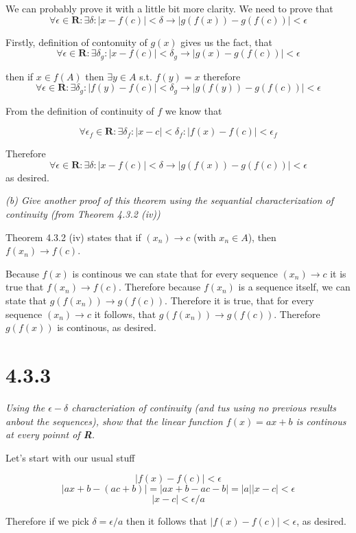 \documentclass[11pt,oneside,titlepage]{book}
\begin{document}
We can probably prove it with a little bit more clarity. We need to prove that
$$\forall \epsilon \in \textbf{R}: \exists \delta: |x - f(c)| < \delta \to
|g(f(x)) - g (f(c))| < \epsilon$$

Firstly, definition of contonuity of $g(x)$ gives us the fact, that 
$$ \forall \epsilon \in \textbf{R}: \exists \delta_g: |x - f(c)| < \delta_g
\to |g(x) - g(f(c))| < \epsilon $$

then if $x \in f(A)$ then $\exists y \in A $ s.t. $f(y) = x$ therefore
$$ \forall \epsilon \in \textbf{R}: \exists \delta_g: |f(y) - f(c)| < \delta_g
\to |g(f(y)) - g(f(c))| < \epsilon $$

From the definition of continuity of $f$ we know that 

$$ \forall \epsilon_f \in \textbf{R}: \exists \delta_f: |x - c | < \delta_f:
|f(x) - f(c)| < \epsilon_f$$

Therefore 
$$\forall \epsilon \in \textbf{R}: \exists \delta: |x - f(c)| < \delta \to
|g(f(x)) - g (f(c))| < \epsilon$$
as desired.

\textit{(b) Give another proof of this theorem using the sequantial
  characterization of continuity (from Theorem 4.3.2 (iv)) }

Theorem 4.3.2 (iv) states that if $(x_n) \to c$ (with $x_n \in A$), then
$f(x_n) \to f(c)$.

Because $f(x)$ is continous we can state that for every sequence $(x_n) \to c$
it is true that $f(x_n) \to f(c)$. Therefore because $f(x_n)$ is a sequence
itself, we can state that $g(f(x_n)) \to g(f(c))$. Therefore it is true, that
for every sequence $(x_n) \to c$ it follows, that $g(f(x_n)) \to g(f(c))$.
Therefore $g(f(x))$ is continous, as desired.

\section*{4.3.3}
\textit{Using the $\epsilon-\delta$ characteriation of continuity (and tus using no previous results anbout the sequences), show that the linear function $f(x) = ax + b$ is continous at every poinnt of \textbf{R}.}

Let's start with our usual stuff

$$ |f(x) - f(c)| < \epsilon $$
$$ |ax + b - (ac + b)| = |ax + b - ac - b| = |a||x - c| < \epsilon $$
$$|x - c| < \epsilon / a $$

Therefore if we pick $\delta = \epsilon / a$ then it follows that $|f(x) - f(c)| < \epsilon$, as desired.
\end{document}
